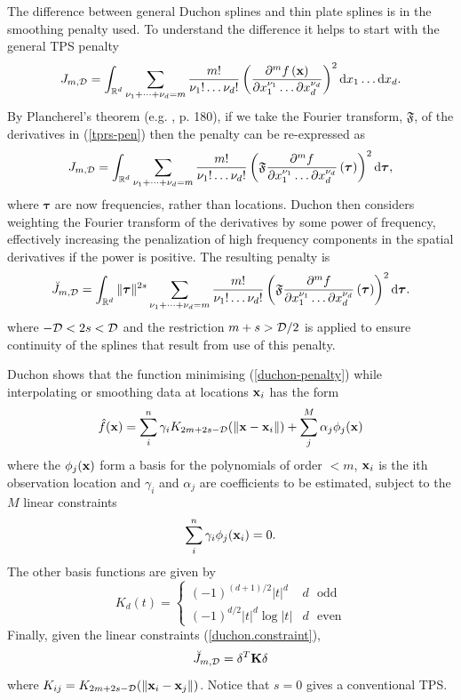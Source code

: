 \documentclass[smallextended]{svjour3}       %
\newcommand{\beq}{\begin{equation}}
\newcommand{\eeq}{\end{equation}}
\newcommand{\ts}{^T}
\begin{document}
The difference between general Duchon splines and thin plate splines is in the smoothing penalty used. To understand the difference it helps to start with the general TPS penalty
\begin{equation}
J_{m,{\cal D}} = \int_{\mathbb{R}^d} \sum_{\nu_1 + \dots + \nu_d=m} \frac{m!}{\nu_1! \dots \nu_d!} \left( \frac{\partial^m f \left (\mathbf{x} \right )}{\partial x_1^{\nu_1} \ldots  \partial x_d^{\nu_d}} \right)^2 \text{d} x_1 \ldots  \text{d} x_d.
\label{tprs-pen}
\end{equation}
By Plancherel's theorem (e.g. \cite{vretblad2003fourier}, p. 180), if we take the Fourier transform, $\mathfrak{F}$, of the derivatives in (\ref{tprs-pen}) then the penalty can be re-expressed as
\begin{equation}
J_{m,{\cal D}} =  \int_{\mathbb{R}^d} \sum_{\nu_1 + \dots + \nu_d=m} \frac{m!}{\nu_1! \dots \nu_d!} \left ( \mathfrak{F} \frac{\partial^m f}{\partial x_1^{\nu_1} \ldots  \partial x_d^{\nu_d}} \left (  \boldsymbol{\tau}\right ) \right )^2 \text{d} \boldsymbol{\tau},
\label{tprs-pen-ft}
\end{equation}
where $\bm \tau$ are now frequencies, rather than locations. Duchon then considers weighting the Fourier transform of the derivatives by some power of frequency, effectively increasing the penalization of high frequency components in the spatial derivatives if the power is positive. The resulting penalty is 
\begin{equation}
\breve{J}_{m,{\cal D}} = \int_{\mathbb{R}^d} \| \boldsymbol{\tau} \|^{2s} \sum_{\nu_1 + \dots + \nu_d=m} \frac{m!}{\nu_1! \dots \nu_d!}\left ( \mathfrak{F} \frac{\partial^m f}{\partial x_1^{\nu_1} \ldots  \partial x_d^{\nu_d}} \left (\boldsymbol{\tau} \right ) \right )^2 \text{d} \boldsymbol{\tau}.
\label{duchon-penalty}
\end{equation}
where $-{\cal D} < 2s < {\cal D}$ and the restriction $m + s > {\cal D}/2$ is applied to ensure continuity of the splines that result from use of this penalty. 

Duchon shows that the function minimising (\ref{duchon-penalty}) while interpolating or smoothing data at locations ${\bf x}_i$ has the form 
$$
\hat f({\bf x}) = \sum_i^n \gamma_i K_{2m+2s-{\cal D}}(\|{\bf x}-{\bf x}_i\|) + \sum_j^M \alpha_j \phi_j({\bf x})
$$
where the $\phi_j({\bf x})$ form a basis for the polynomials of order $<m$, ${\bf x}_i$ is the ith observation location and $\gamma_i$ and $\alpha_j$ are coefficients to be estimated, subject to the $M$ linear constraints
\beq
\sum_i^n \gamma_i \phi_j({\bf x}_i)=0.
\label{duchon.constraint}
\eeq
The other basis functions are given by
$$
K_d(t) = \left \{ \begin{array}{ll}
(-1)^{(d+1)/2}|t|^d & d \text{~~odd}\\
(-1)^{d/2}|t|^d\log |t| & d \text{~~even}
\end{array} \right .
$$
Finally, given the linear constraints (\ref{duchon.constraint}),
$$
\breve{J}_{m,{\cal D}} = {\bf \delta} \ts {\bf K} {\bf \delta}
$$
where $K_{ij} = K_{2m+2s-{\cal D}}(\|{\bf x}_i-{\bf x}_j\|)$. Notice that $s=0$ gives a conventional TPS.
\end{document}
